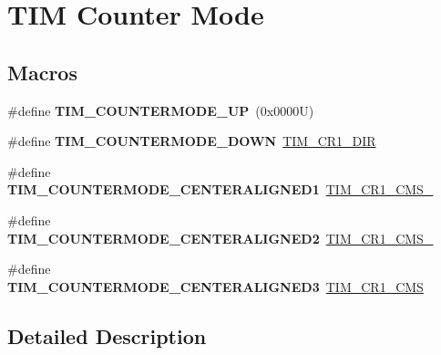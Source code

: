 \hypertarget{group___t_i_m___counter___mode}{}\section{T\+IM Counter Mode}
\label{group___t_i_m___counter___mode}
\subsection*{Macros}
\begin{DoxyCompactItemize}
\item 
\mbox{\label{group___t_i_m___counter___mode_ga9eb9ab91119c2c76d4db453d599c0b7d}} 
\#define {\bfseries T\+I\+M\+\_\+\+C\+O\+U\+N\+T\+E\+R\+M\+O\+D\+E\+\_\+\+UP}~(0x0000\+U)
\item 
\mbox{\label{group___t_i_m___counter___mode_ga5f590fdd7c41df7180b870bb76ff691c}} 
\#define {\bfseries T\+I\+M\+\_\+\+C\+O\+U\+N\+T\+E\+R\+M\+O\+D\+E\+\_\+\+D\+O\+WN}~\hyperlink{group___peripheral___registers___bits___definition_gacea10770904af189f3aaeb97b45722aa}{T\+I\+M\+\_\+\+C\+R1\+\_\+\+D\+IR}
\item 
\mbox{\label{group___t_i_m___counter___mode_ga26d8e5236c35d85c2abaa482b5ec6746}} 
\#define {\bfseries T\+I\+M\+\_\+\+C\+O\+U\+N\+T\+E\+R\+M\+O\+D\+E\+\_\+\+C\+E\+N\+T\+E\+R\+A\+L\+I\+G\+N\+E\+D1}~\hyperlink{group___peripheral___registers___bits___definition_ga83ca6f7810aba73dc8c12f22092d97a2}{T\+I\+M\+\_\+\+C\+R1\+\_\+\+C\+M\+S\+\_}
\item 
\mbox{\label{group___t_i_m___counter___mode_gae4517c68086ffa61a694576cec8fe634}} 
\#define {\bfseries T\+I\+M\+\_\+\+C\+O\+U\+N\+T\+E\+R\+M\+O\+D\+E\+\_\+\+C\+E\+N\+T\+E\+R\+A\+L\+I\+G\+N\+E\+D2}~\hyperlink{group___peripheral___registers___bits___definition_gab3ee4adcde3c001d3b97d2eae1730ea9}{T\+I\+M\+\_\+\+C\+R1\+\_\+\+C\+M\+S\+\_}
\item 
\mbox{\label{group___t_i_m___counter___mode_gaf0c3edf6ea1ade3520ab4970e1fc6e92}} 
\#define {\bfseries T\+I\+M\+\_\+\+C\+O\+U\+N\+T\+E\+R\+M\+O\+D\+E\+\_\+\+C\+E\+N\+T\+E\+R\+A\+L\+I\+G\+N\+E\+D3}~\hyperlink{group___peripheral___registers___bits___definition_ga352b3c389bde13dd6049de0afdd874f1}{T\+I\+M\+\_\+\+C\+R1\+\_\+\+C\+MS}
\end{DoxyCompactItemize}


\subsection{Detailed Description}
